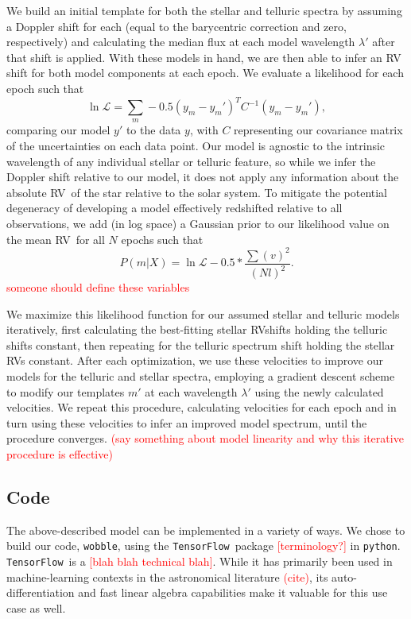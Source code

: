 \documentclass[twocolumn]{aastex62}
\newcommand{\todo}[1]{\textcolor{red}{#1}}  %
\newcommand{\acronym}[1]{{\small{#1}}}
\newcommand{\code}[1]{\texttt{#1}}
\newcommand{\RV}{\acronym{RV}}
\newcommand{\wobble}{\code{wobble}}
\newcommand{\TF}{\code{TensorFlow}}
\begin{document}
We build an initial template for both the stellar and telluric spectra by assuming a Doppler shift for each (equal to the barycentric correction and zero, respectively) and calculating the median flux at each model wavelength $\lambda'$ after that shift is applied.
With these models in hand, we are then able to infer an RV shift for both model components at each epoch.
We evaluate a likelihood for each epoch such that
$$ \ln \mathcal{L} = \sum_{m} -0.5 (y_m - y_m')^T C^{-1} (y_m-y_m'),
$$
comparing our model $y'$ to the data $y$, with $C$ representing our covariance matrix of the uncertainties on each data point.
Our model is agnostic to the intrinsic wavelength of any individual stellar or telluric feature, so while we infer the  Doppler shift relative to our model, it does not apply any information about the absolute \RV\ of the star relative to the solar system. 
To mitigate the potential degeneracy of developing a model effectively redshifted relative to all observations, we add (in log space) a Gaussian prior to our likelihood value on the mean \RV\ for all $N$ epochs such that
$$ P(m|X) = \ln \mathcal{L}  -0.5 * \frac{\sum(v)^2}{(Nl)^2}.
$$
\todo{someone should define these variables}

We maximize this likelihood function for our assumed stellar and telluric models iteratively, first calculating the best-fitting stellar \RV shifts holding the telluric shifts constant, then repeating for the telluric spectrum shift holding the stellar \RV s constant.
After each optimization, we use these velocities to improve our models for the telluric and stellar spectra, employing a gradient descent scheme to modify our templates $m'$ at each wavelength $\lambda'$ using the newly calculated velocities.
We repeat this procedure, calculating velocities for each epoch and in turn using these velocities to infer an improved model spectrum, until the procedure converges. 
\todo{(say something about model linearity and why this iterative procedure is effective)}

\subsection{Code}

The above-described model can be implemented in a variety of ways. We chose to build our code, \wobble, using the \TF\ package \todo{[terminology?]} in \code{python}. \TF\ is a \todo{[blah blah technical blah]}. While it has primarily been used in machine-learning contexts in the astronomical literature \todo{(cite)}, its auto-differentiation and fast linear algebra capabilities make it valuable for this use case as well.
\end{document}
